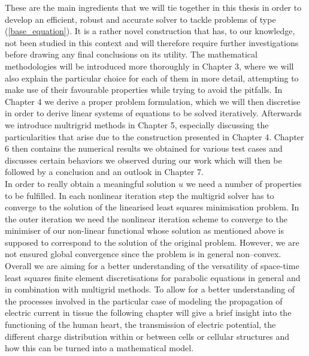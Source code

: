 \documentclass[../draft_1.tex]{subfiles}
\begin{document}
These are the main ingredients that we will tie together in this thesis in order to develop an efficient, robust and accurate solver to tackle problems of type (\ref{base_equation}). It is a rather novel construction that has, to our knowledge, not been studied in this context and will therefore require further investigations before drawing any final conclusions on its utility. The mathematical methodologies will be introduced more thoroughly in Chapter 3, where we will also explain the particular choice for each of them in more detail, attempting to make use of their favourable properties while trying to avoid the pitfalls. In Chapter 4 we derive a proper problem formulation, which we will then discretise in order to derive linear systems of equations to be solved iteratively. Afterwards we introduce multrigrid methods in Chapter 5, especially discussing the particularities that arise due to the construction presented in Chapter 4. Chapter 6 then contains the numerical results we obtained for various test cases and discusses certain behaviors we observed during our work which will then be followed by a conclusion and an outlook in Chapter 7. 
\bigskip
\\ 
In order to really obtain a meaningful solution $u$ we need a number of properties to be fulfilled. In each nonlinear iteration step the multigrid solver has to converge to the solution of the linearised least squares minimisation problem. In the outer iteration we need the nonlinear iteration scheme to converge to the minimiser of our non-linear functional whose solution as mentioned above is supposed to correspond to the solution of the original problem. However, we are not ensured global convergence since the problem is in general non--convex. 
\bigskip
\\
Overall we are aiming for a better understanding of the versatility of space-time least squares finite element discretisations for parabolic equations in general and in combination with multigrid methods. 
To allow for a better understanding of the processes involved in the particular case of modeling the propagation of electric current in tissue the following chapter will give a brief insight into the functioning of the human heart, the transmission of electric potential, the different charge distribution within or between cells or cellular structures and how this can be turned into a mathematical model. 
\end{document}
